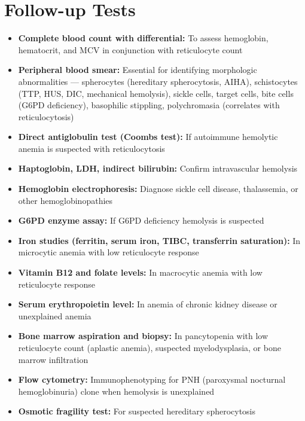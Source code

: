 \section*{Follow-up Tests}
\begin{itemize}
  \item \textbf{Complete blood count with differential:} To assess hemoglobin, hematocrit, and MCV in conjunction with reticulocyte count
  \item \textbf{Peripheral blood smear:} Essential for identifying morphologic abnormalities --- spherocytes (hereditary spherocytosis, AIHA), schistocytes (TTP, HUS, DIC, mechanical hemolysis), sickle cells, target cells, bite cells (G6PD deficiency), basophilic stippling, polychromasia (correlates with reticulocytosis)
  \item \textbf{Direct antiglobulin test (Coombs test):} If autoimmune hemolytic anemia is suspected with reticulocytosis
  \item \textbf{Haptoglobin, LDH, indirect bilirubin:} Confirm intravascular hemolysis
  \item \textbf{Hemoglobin electrophoresis:} Diagnose sickle cell disease, thalassemia, or other hemoglobinopathies
  \item \textbf{G6PD enzyme assay:} If G6PD deficiency hemolysis is suspected
  \item \textbf{Iron studies (ferritin, serum iron, TIBC, transferrin saturation):} In microcytic anemia with low reticulocyte response
  \item \textbf{Vitamin B12 and folate levels:} In macrocytic anemia with low reticulocyte response
  \item \textbf{Serum erythropoietin level:} In anemia of chronic kidney disease or unexplained anemia
  \item \textbf{Bone marrow aspiration and biopsy:} In pancytopenia with low reticulocyte count (aplastic anemia), suspected myelodysplasia, or bone marrow infiltration
  \item \textbf{Flow cytometry:} Immunophenotyping for PNH (paroxysmal nocturnal hemoglobinuria) clone when hemolysis is unexplained
  \item \textbf{Osmotic fragility test:} For suspected hereditary spherocytosis
\end{itemize}

